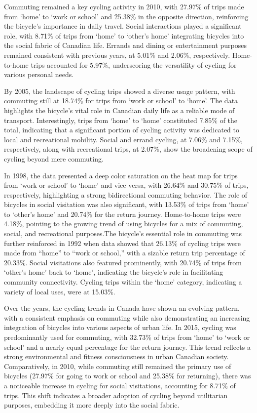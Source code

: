 \documentclass[
11pt, %
oneside, %
english, %
singlespacing, %
]{macthesis} %
\begin{document}
Commuting remained a key cycling activity in 2010, with 27.97\% of trips made from `home' to `work or school' and 25.38\% in the opposite direction, reinforcing the bicycle's importance in daily travel. Social interactions played a significant role, with 8.71\% of trips from `home' to `other's home' integrating bicycles into the social fabric of Canadian life. Errands and dining or entertainment purposes remained consistent with previous years, at 5.01\% and 2.06\%, respectively. Home-to-home trips accounted for 5.97\%, underscoring the versatility of cycling for various personal needs.

By 2005, the landscape of cycling trips showed a diverse usage pattern, with commuting still at 18.74\% for trips from `work or school' to `home'. The data highlights the bicycle's vital role in Canadian daily life as a reliable mode of transport. Interestingly, trips from `home' to `home' constituted 7.85\% of the total, indicating that a significant portion of cycling activity was dedicated to local and recreational mobility. Social and errand cycling, at 7.06\% and 7.15\%, respectively, along with recreational trips, at 2.07\%, show the broadening scope of cycling beyond mere commuting.

In 1998, the data presented a deep color saturation on the heat map for trips from `work or school' to `home' and vice versa, with 26.64\% and 30.75\% of trips, respectively, highlighting a strong bidirectional commuting behavior. The role of bicycles in social visitation was also significant, with 13.53\% of trips from `home' to `other's home' and 20.74\% for the return journey. Home-to-home trips were 4.18\%, pointing to the growing trend of using bicycles for a mix of commuting, social, and recreational purposes.The bicycle's essential role in commuting was further reinforced in 1992 when data showed that 26.13\% of cycling trips were made from ``home'' to ``work or school,'' with a sizable return trip percentage of 20.33\%. Social visitations also featured prominently, with 20.74\% of trips from `other's home' back to `home', indicating the bicycle's role in facilitating community connectivity. Cycling trips within the `home' category, indicating a variety of local uses, were at 15.03\%.

Over the years, the cycling trends in Canada have shown an evolving pattern, with a consistent emphasis on commuting while also demonstrating an increasing integration of bicycles into various aspects of urban life. In 2015, cycling was predominantly used for commuting, with 32.73\% of trips from `home' to `work or school' and a nearly equal percentage for the return journey. This trend reflects a strong environmental and fitness consciousness in urban Canadian society. Comparatively, in 2010, while commuting still remained the primary use of bicycles (27.97\% for going to work or school and 25.38\% for returning), there was a noticeable increase in cycling for social visitations, accounting for 8.71\% of trips. This shift indicates a broader adoption of cycling beyond utilitarian purposes, embedding it more deeply into the social fabric.
\end{document}
